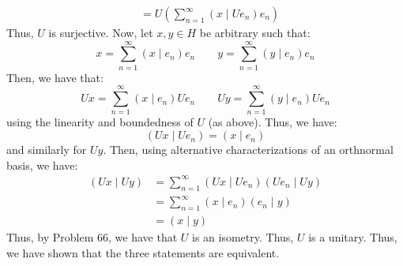 \documentclass[12pt]{article}
\begin{document}
\begin{solution}
\begin{align*}
        &= U\left(\sum_{n=1}^\infty (x \mid Ue_n)e_n\right)
    \end{align*}
    Thus, $U$ is surjective. Now, let $x, y \in H$ be arbitrary such that:
    \[ x = \sum_{n=1}^\infty (x \mid e_n)e_n \qquad y = \sum_{n=1}^\infty (y \mid e_n)e_n\]
    Then, we have that:
    \[ Ux = \sum_{n=1}^\infty (x \mid e_n)Ue_n \qquad Uy = \sum_{n=1}^\infty (y \mid e_n)Ue_n\]
    using the linearity and boundedness of $U$ (as above). Thus, we have:
    \[ (Ux \mid Ue_n) = (x \mid e_n)\]
    and similarly for $Uy$. Then, using alternative characterizations of an orthnormal basis, we have:
    \begin{align*}
        (Ux \mid Uy) &= \sum_{n=1}^\infty (Ux \mid Ue_n)(Ue_n \mid Uy) \\
        &=  \sum_{n=1}^\infty (x \mid e_n)(e_n \mid y) \\
        &= (x \mid y)
    \end{align*}
    Thus, by Problem 66, we have that $U$ is an isometry. Thus, $U$ is a unitary. \bbni
    Thus, we have shown that the three statements are equivalent.
\end{solution}
\newpage
\end{document}
